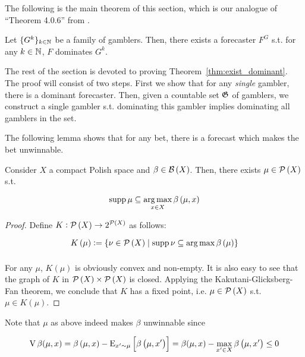 The following is the main theorem of this section, which is our analogue of \enquote{Theorem 4.0.6} from \cite{Garrabrant_2016}.

\begin{theorem}
\label{thm:exist_dominant}

Let $\{G^k\}_{k \in \mathbb{N}}$ be a family of gamblers. Then, there exists a forecaster $F^G$ s.t. for any $k \in \mathbb{N}$, $F$ dominates $G^k$.

\end{theorem}

The rest of the section is devoted to proving Theorem~\ref{thm:exist_dominant}. The proof will consist of two steps. First we show that for any \emph{single} gambler, there is a dominant forecaster. Then, given a countable set $\mathfrak{G}$ of gamblers, we construct a single gambler s.t. dominating this gambler implies dominating all gamblers in the set.

The following lemma shows that for any bet, there is a forecast which makes the bet unwinnable.

\begin{lemma}
\label{lmm:unwinnable}

Consider $X$ a compact Polish space and $\beta \in \mathcal{B}\left(X\right)$. Then, there exists $\mu \in \mathcal{P}\left(X\right)$ s.t.

\begin{equation}
\operatorname{supp} \mu \subseteq \underset{x\in X}{\operatorname{arg\,max}}\, \beta\left(\mu,x\right)
\end{equation}

\end{lemma}

\begin{proof}

Define ${K: \mathcal{P}\left(X\right) \rightarrow 2^{\mathcal{P}\left(X\right)}}$ as follows:

\[K\left(\mu\right):=\{\nu \in \mathcal{P}\left(X\right) \mid \operatorname{supp}{\nu} \subseteq \underset{}{\operatorname{arg\,max}}\,{\beta\left(\mu\right)}\}\]

For any ${\mu}$, ${K}\left(\mu\right)$ is obviously convex and non-empty. It is also easy to see that the graph of $K$ in $\mathcal{P}\left(X\right) \times \mathcal{P}\left(X\right)$ is closed. Applying the Kakutani-Glicksberg-Fan theorem, we conclude that $K$ has a fixed point, i.e. $\mu \in \mathcal{P}\left(X\right)$ s.t. $\mu \in K\left(\mu\right)$.
\end{proof}

Note that $\mu$ as above indeed makes $\beta$ unwinnable since

$$\operatorname{V}{\beta}(\mu,x) = \beta\left(\mu,x\right) - \operatorname{E}_{x' \sim \mu}\left[\beta\left(\mu,x'\right)\right] = \beta(\mu,x)- \max_{x'\in X} \beta\left(\mu,x'\right) \leq 0$$

